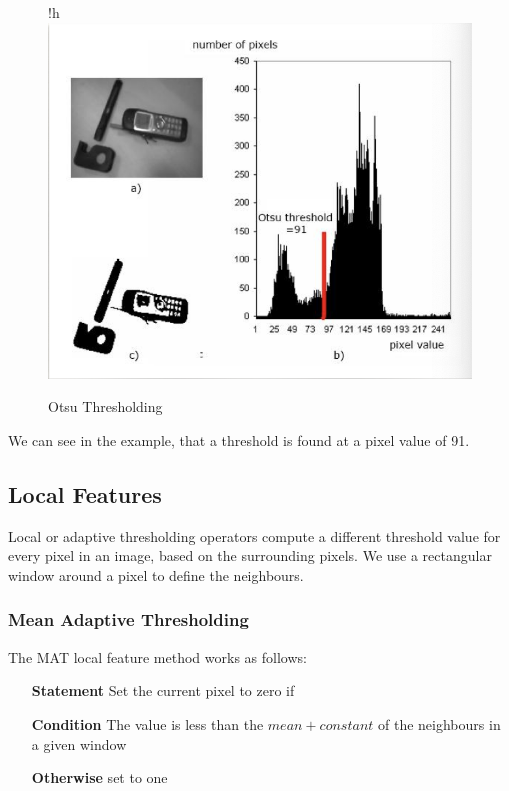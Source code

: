 \begin{figure}{!h}
    \centering
    \includegraphics[scale=0.4]{Images/Otsu.png}
    \caption{Otsu Thresholding}
    \label{fig:otsu}
\end{figure}

We can see in the example, that a threshold is found at a pixel value of 91.


\subsection{Local Features}

Local or adaptive thresholding operators compute a different threshold value for every pixel in an image, based on the surrounding pixels. We use a rectangular window around a pixel to define the neighbours.

\subsubsection{Mean Adaptive Thresholding}
The MAT local feature method works as follows:
\begin{itemize}
    \itemsep0em 
    \item [\textbf{Statement}] Set the current pixel to zero if
    \item [\textbf{Condition}] The value is less than the $mean+constant$ of the neighbours in a given window 
    \item [\textbf{Otherwise}] set to one
\end{itemize}

